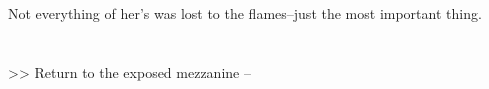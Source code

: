 Not everything of her’s was lost to the flames--just the most important thing.\\
\\
\\

>> Return to the exposed mezzanine -- 